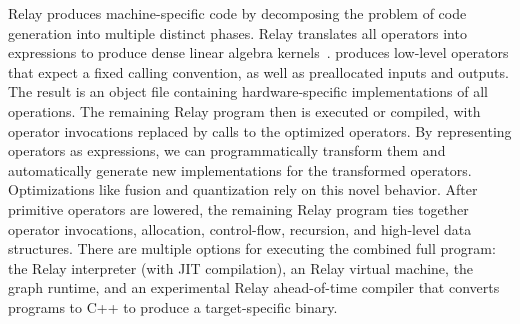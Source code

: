   Relay produces machine-specific code
    by decomposing the problem of code generation into multiple distinct phases.
  Relay translates all operators into \tvm expressions
    to produce dense linear algebra kernels~\citep{tvm_osdi18, tensor_comprehensions, halide}.
  \tvm produces low-level operators that expect a fixed calling convention,
    as well as preallocated inputs and outputs.
  The result is an object file containing hardware-specific implementations of all
    operations.
  The remaining Relay program then is executed or compiled,
    with operator invocations replaced by calls to the optimized operators.
  By representing operators as \tvm expressions, we can programmatically
    transform them and automatically generate new implementations for the transformed operators.
  Optimizations like fusion and quantization
    rely on this novel behavior.
  After primitive operators are lowered,
    the remaining Relay program ties
    together operator invocations, allocation, control-flow,
    recursion, and high-level data structures.
  There are multiple options for executing the combined full program:
    the Relay interpreter (with JIT compilation),
    an Relay virtual machine,
    the \tvm graph runtime,
    and an experimental Relay ahead-of-time compiler
    that converts programs to C++ to produce a target-specific binary.




